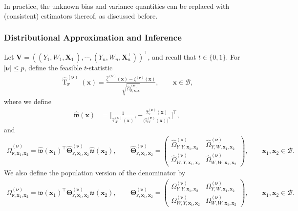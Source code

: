 \documentclass[10pt]{article}
\DeclareMathOperator{\Tstat}{T}
\newcommand{\bV}{\mathbf{V}}
\newcommand{\bx}{\mathbf{x}}
\newcommand{\bX}{\mathbf{X}}
\newcommand{\bnu}{\boldsymbol{\nu}}
\newcommand{\bTheta}{\boldsymbol{\Theta}}
\newcommand{\B}{\mathcal{B}}
\newcommand{\ttF}{\mathtt{F}}
\begin{document}
In practice, the unknown bias and variance quantities can be replaced with (consistent) estimators thereof, as discussed before.


\subsubsection{Distributional Approximation and Inference}

Let $\bV = ((Y_1,W_1,\bX_1^{\top}), \cdots, (Y_n,W_n,\bX_n^{\top}))^{\top}$, and recall that $t \in \{0,1\}$. For $|\bnu| \leq p$, define the feasible $t$-statistic
\begin{align*}
    \widehat{\Tstat}_\mathtt{F}^{(\bnu)}(\bx)
    = \frac{\widehat{\zeta}^{(\bnu)}(\bx) - \zeta^{(\bnu)}(\bx)}{\sqrt{\widehat{\Omega}_{\mathtt{F},\bx,\bx}^{(\bnu)}}},
    \qquad \bx \in \B,
\end{align*}
where we define
\begin{align*}
    \widehat{\mathfrak{w}}(\bx)
    &= \Big[ \frac{1}{\widehat{\tau}^{(\bnu)}_W(\bx)}, -\frac{\widehat{\tau}^{(\bnu)}_Y(\bx)}{\big(\widehat{\tau}^{(\bnu)}_W(\bx)\big)^2} \Big]^\top,
\end{align*}
and
\begin{align*}
    \widehat{\Omega}_{\mathtt{F},\bx_1,\bx_2}^{(\bnu)}
    = \widehat{\mathfrak{w}}(\bx_1)^\top \widehat{\bTheta}_{\ttF, \bx_1, \bx_2}^{(\bnu)} \widehat{\mathfrak{w}}(\bx_2),
    \qquad
    \widehat{\bTheta}_{\ttF, \bx_1, \bx_2}^{(\bnu)}
    = \begin{pmatrix}
        \widehat{\Omega}_{Y,Y,\bx_1, \bx_2}^{(\bnu)} & \widehat{\Omega}_{Y,W,\bx_1, \bx_2}^{(\bnu)} \\
        \widehat{\Omega}_{W,Y,\bx_1, \bx_2}^{(\bnu)} & \widehat{\Omega}_{W,W,\bx_1, \bx_2}^{(\bnu)}
      \end{pmatrix}, \qquad \bx_1, \bx_2 \in \B.
\end{align*}
We also define the population version of the denominator by
\begin{align*}
    \Omega_{\mathtt{F},\bx_1, \bx_2}^{(\bnu)}
    = \mathfrak{w}(\bx_1)^\top \bTheta_{\ttF, \bx_1, \bx_2}^{(\bnu)} \mathfrak{w}(\bx_2),
    \qquad
    \bTheta_{\ttF, \bx_1, \bx_2}^{(\bnu)}
    = \begin{pmatrix}
        \Omega_{Y,Y,\bx_1, \bx_2}^{(\bnu)} & \Omega_{Y,W,\bx_1, \bx_2}^{(\bnu)} \\
        \Omega_{W,Y,\bx_1, \bx_2}^{(\bnu)} & \Omega_{W,W,\bx_1, \bx_2}^{(\bnu)}
      \end{pmatrix}, \qquad \bx_1, \bx_2 \in \B.
\end{align*}
\end{document}
